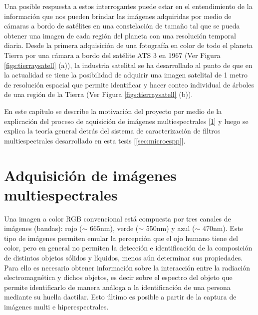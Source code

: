 Una posible respuesta a estos interrogantes puede estar en el entendimiento de la información que nos pueden brindar las imágenes adquiridas por medio de cámaras a bordo de satélites en una constelación de tamaño tal que se pueda obtener una imagen de cada región del planeta con una resolución temporal diaria. Desde la primera adquisición de una fotografía en color de todo el planeta Tierra por una cámara a bordo del satélite ATS 3 en 1967 (Ver Figura \ref{figs:tierraysatell} (a)), la industria satelital se ha desarrollado al punto de que en la actualidad se tiene la posibilidad de adquirir una imagen satelital de 1 metro de resolución espacial que permite identificar y hacer conteo individual de árboles de una región de la Tierra (Ver Figura \ref{figs:tierraysatell} (b)).

En este capítulo se describe la motivación del proyecto por medio de la explicación del proceso de aquisición de imágenes multiespectrales [\ref{sec:motivacion}] y luego se explica la teoría general detrás del sistema de caracterización de filtros multiespectrales desarrollado en esta tesis [\ref{sec:microespp}].

\singlespacing
\section{Adquisición de imágenes multiespectrales}
\label{sec:motivacion}


\hspace{0.5cm}Una imagen a color RGB convencional está compuesta por tres 
canales de 
imágenes (bandas): rojo 
($\sim$ 665nm), verde ($\sim$ 550nm) y azul ($\sim$ 470nm). Este tipo de 
imágenes permiten emular la percepción que el ojo humano tiene del color, pero 
en general no permiten la detección e identificación de la composición de distintos objetos 
sólidos y 
líquidos, menos 
aún determinar sus propiedades. Para ello 
es necesario obtener información sobre la interacción entre la radiación electromagnética y dichos objetos, es decir sobre el espectro del objeto que permite identificarlo de manera análoga a la identificación de una persona mediante su huella dactilar. Esto último es posible a partir de la captura de imágenes multi e hiperespectrales.

